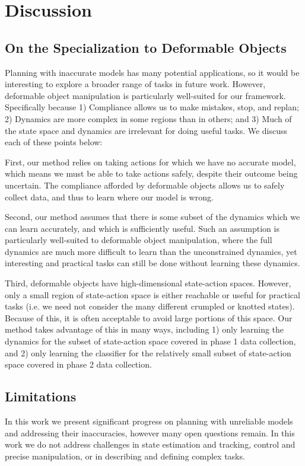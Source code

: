 \section{Discussion} \label{SciRob:sec:discussion}

\subsection{On the Specialization to Deformable Objects}
Planning with inaccurate models has many potential applications, so it would be interesting to explore a broader range of tasks in future work. However, deformable object manipulation is particularly well-suited for our framework. Specifically because  1) Compliance allows us to make mistakes, stop, and replan; 2) Dynamics are more complex in some regions than in others; and 3) Much of the state space and dynamics are irrelevant for doing useful tasks. We discuss each of these points below:

First, our method relies on taking actions for which we have no accurate model, which means we must be able to take actions safely, despite their outcome being uncertain. The compliance afforded by deformable objects allows us to safely collect data, and thus to learn where our model is wrong.

Second, our method assumes that there is some subset of the dynamics which we can learn accurately, and which is sufficiently useful. Such an assumption is particularly well-suited to deformable object manipulation, where the full dynamics are much more difficult to learn than the unconstrained dynamics, yet interesting and practical tasks can still be done without learning these dynamics.

Third, deformable objects have high-dimensional state-action spaces. However, only a small region of state-action space is either reachable or useful for practical tasks (i.e. we need not consider the many different crumpled or knotted states). Because of this, it is often acceptable to avoid large portions of this space. Our method takes advantage of this in many ways, including 1) only learning the dynamics for the subset of state-action space covered in phase 1 data collection, and 2) only learning the classifier for the relatively small subset of state-action space covered in phase 2 data collection.

\subsection{Limitations} In this work we present significant progress on planning with unreliable models and addressing their inaccuracies, however many open questions remain. In this work we do not address challenges in state estimation and tracking, control and precise manipulation, or in describing and defining complex tasks.

